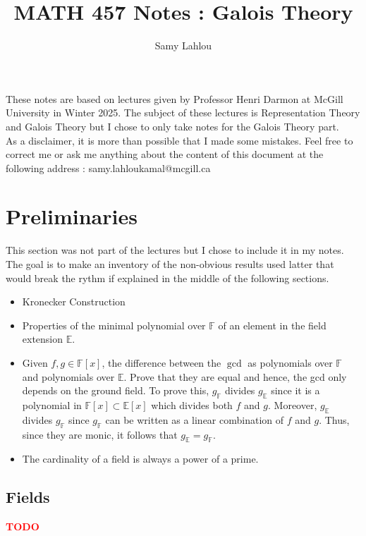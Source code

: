 \documentclass{article}
\title{MATH 457 Notes : Galois Theory}
\author{Samy Lahlou}
\date{}
\newcommand{\F}{\mathbb{F}}
\newcommand{\E}{\mathbb{E}}
\newcommand{\td}{\textcolor{red}{\textbf{TODO}}}
\begin{document}
\maketitle

These notes are based on lectures given by Professor Henri Darmon at McGill University in Winter 2025. The subject of these lectures is Representation Theory and Galois Theory but I chose to only take notes for the Galois Theory part. \\
As a disclaimer, it is more than possible that I made some mistakes. Feel free to correct me or ask me anything about the content of this document at the following address : samy.lahloukamal@mcgill.ca

\tableofcontents

\newpage

\section{Preliminaries}

This section was not part of the lectures but I chose to include it in my notes. The goal is to make an inventory of the non-obvious results used latter that would break the rythm if explained in the middle of the following sections.

\begin{itemize}
    \item Kronecker Construction
    \item Properties of the minimal polynomial over $\F$ of an element in the field extension $\E$.
    \item Given $f,g \in \F[x]$, the difference between the $\gcd$ as polynomials over $\F$ and polynomials over $\E$. Prove that they are equal and hence, the gcd only depends on the ground field. To prove this, $g_{\F}$ divides $g_{\E}$ since it is a polynomial in $\F[x] \subset \E[x]$ which divides both $f$ and $g$. Moreover, $g_{\E}$ divides $g_{\F}$ since $g_{\F}$ can be written as a linear combination of $f$ and $g$. Thus, since they are monic, it follows that $g_{\E} = g_{\F}$.
    \item The cardinality of a field is always a power of a prime.
\end{itemize}

\subsection{Fields}

\td
\end{document}
